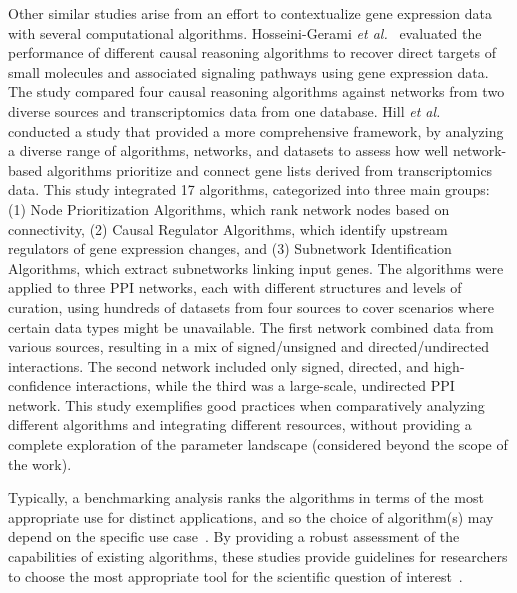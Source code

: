 Other similar studies arise from an effort to contextualize gene expression data with several computational algorithms. Hosseini-Gerami \textit{et al.}~\cite{RN53} evaluated the performance of different causal reasoning algorithms to recover direct targets of small molecules and associated signaling pathways using gene expression data. The study compared four causal reasoning algorithms against networks from two diverse sources and transcriptomics data from  one database. Hill \textit{et al.}~\cite{RN37} conducted a study that provided a more comprehensive framework, by analyzing a diverse range of algorithms, networks, and datasets to assess how well network-based algorithms prioritize and connect gene lists derived from transcriptomics data. This study integrated 17 algorithms, categorized into three main groups: (1) Node Prioritization Algorithms, which rank network nodes based on connectivity, (2) Causal Regulator Algorithms, which identify upstream regulators of gene expression changes, and (3) Subnetwork Identification Algorithms, which extract subnetworks linking input genes. The algorithms were applied to three PPI networks, each with different structures and levels of curation, using hundreds of datasets from four sources to cover scenarios where certain data types might be unavailable. The first network combined data from various sources, resulting in a mix of signed/unsigned and directed/undirected interactions. The second network included only signed, directed, and high-confidence interactions, while the third was a large-scale, undirected PPI network. This study exemplifies good practices when comparatively analyzing different algorithms and integrating different resources, without providing a complete exploration of the parameter landscape (considered beyond the scope of the work).

Typically, a benchmarking analysis ranks the algorithms in terms of the most appropriate use for distinct applications, and so the choice of algorithm(s) may depend on the specific use case~\cite{RN37}. By providing a robust assessment of the capabilities of existing algorithms, these studies provide guidelines for researchers to choose the most appropriate tool for the scientific question of interest~\cite{RN108}.
